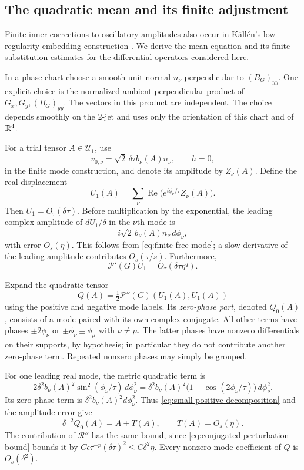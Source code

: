 \subsection{The quadratic mean and its finite adjustment}

Finite inner corrections to oscillatory amplitudes also occur in
K\"all\'en's low-regularity embedding construction
\cite[Lemma~3.3 and its proof]{Kallen1978}.
We derive the mean equation and its finite substitution estimates for
the differential operators considered here.

In a phase chart choose a smooth unit normal $n_\nu$ perpendicular to
$(B_G)_{yy}$. One explicit choice is the normalized ambient perpendicular
product of $G_x,G_y,(B_G)_{yy}$. The vectors in this product are independent.
The choice depends smoothly on the 2-jet and uses only the orientation of this
chart and of $\mathbb{R}^4$.

For a trial tensor $A\in\mathcal U_1$, use
\[
 v_{0,\nu}=\sqrt2\,\delta\tau b_\nu(A)n_\nu,\qquad h=0,
\]
in the finite mode construction, and denote its amplitude by $Z_\nu(A)$.
Define the real displacement
\[
 U_1(A)=\sum_\nu\operatorname{Re}
             \bigl(e^{i\phi_\nu/\tau}Z_\nu(A)\bigr).
\]
Then $U_1=O_\tau(\delta\tau)$. Before multiplication by the exponential, the
leading complex amplitude of $dU_1/\delta$ in the $\nu$th mode is
\[
 i\sqrt2\,b_\nu(A)n_\nu\,d\phi_\nu,
\]
with error $O_s(\eta)$. This follows from \eqref{eq:finite-free-mode}; a
slow derivative of the leading amplitude contributes $O_s(\tau/s)$.
Furthermore,
\begin{equation}\label{eq:free-sum-linear-error}
 \mathcal P'(G)U_1=O_\tau(\delta\tau\eta^q).
\end{equation}

Expand the quadratic tensor
\[
 Q(A)=\tfrac12\mathcal P''(G)(U_1(A),U_1(A))
\]
using the positive and negative mode labels. Its \emph{zero-phase part}, denoted
$Q_0(A)$, consists of a mode paired with its own complex conjugate. All other
terms have phases $\pm2\phi_\nu$ or $\pm\phi_\nu\pm\phi_\mu$ with
$\nu\ne\mu$. The latter phases have nonzero differentials on their supports,
by hypothesis; in particular they do not contribute another zero-phase term.
Repeated nonzero phases may simply be grouped.

For one leading real mode, the metric quadratic term is
\[
 2\delta^2b_\nu(A)^2\sin^2(\phi_\nu/\tau)\,d\phi_\nu^2
 =\delta^2b_\nu(A)^2
       \bigl(1-\cos(2\phi_\nu/\tau)\bigr)\,d\phi_\nu^2.
\]
Its zero-phase term is $\delta^2b_\nu(A)^2d\phi_\nu^2$. Thus
\eqref{eq:small-positive-decomposition} and the amplitude error give
\begin{equation}\label{eq:quadratic-mean-map}
 \delta^{-2}Q_0(A)=A+T(A),\qquad T(A)=O_s(\eta).
\end{equation}
The contribution of $\mathcal R''$ has the same bound, since
\eqref{eq:conjugated-perturbation-bound} bounds it by
$C\epsilon\tau^{-p}(\delta\tau)^2\leq C\delta^2\eta$.
Every nonzero-mode coefficient of $Q$ is $O_s(\delta^2)$.

